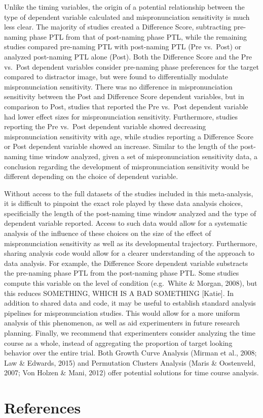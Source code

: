 \documentclass[man]{apa6}
\theoremstyle{definition}
\theoremstyle{definition}
\theoremstyle{definition}
\theoremstyle{remark}
\begin{document}
Unlike the timing variables, the origin of a potential relationship
between the type of dependent variable calculated and mispronunciation
sensitivity is much less clear. The majority of studies created a
Difference Score, subtracting pre-naming phase PTL from that of
post-naming phase PTL, while the remaining studies compared pre-naming
PTL with post-naming PTL (Pre vs.~Post) or analyzed post-naming PTL
alone (Post). Both the Difference Score and the Pre vs.~Post dependent
variables consider pre-naming phase preferences for the target compared
to distractor image, but were found to differentially modulate
mispronunciation sensitivity. There was no difference in
mispronunciation sensitivity between the Post and Difference Score
dependent variables, but in comparison to Post, studies that reported
the Pre vs.~Post dependent variable had lower effect sizes for
mispronunciation sensitivity. Furthermore, studies reporting the Pre
vs.~Post dependent variable showed decreasing mispronunciation
sensitivity with age, while studies reporting a Difference Score or Post
dependent variable showed an increase. Similar to the length of the
post-naming time window analyzed, given a set of mispronunciation
sensitivity data, a conclusion regarding the development of
mispronunciation sensitivity would be different depending on the choice
of dependent variable.

Without access to the full datasets of the studies included in this
meta-analysis, it is difficult to pinpoint the exact role played by
these data analysis choices, specificially the length of the post-naming
time window analyzed and the type of dependent variable reported. Access
to such data would allow for a systematic analysis of the influence of
these choices on the size of the effect of mispronunciation sensitivity
as well as its developmental trajectory. Furthermore, sharing analysis
code would allow for a clearer understanding of the approach to data
analysis. For example, the Difference Score dependent variable
substracts the pre-naming phase PTL from the post-naming phase PTL. Some
studies compute this variable on the level of condition (e.g.~White \&
Morgan, 2008), but this reduces SOMETHING, WHICH IS A BAD SOMETHING
{[}Katie{]}. In addition to shared data and code, it may be useful to
establish standard analysis pipelines for mispronunciation studies. This
would allow for a more uniform analysis of this phenomenon, as well as
aid experimenters in future research planning. Finally, we recommend
that experimenters consider analyzing the time course as a whole,
instead of aggregating the proportion of target looking behavior over
the entire trial. Both Growth Curve Analysis (Mirman et al., 2008; Law
\& Edwards, 2015) and Permutation Clusters Analysis (Maris \&
Oostenveld, 2007; Von Holzen \& Mani, 2012) offer potential solutions
for time course analysis.

\newpage

\section{References}\label{references}

\begingroup
\setlength{\parindent}{-0.5in} \setlength{\leftskip}{0.5in}

\hypertarget{refs}{}

\endgroup
\end{document}
